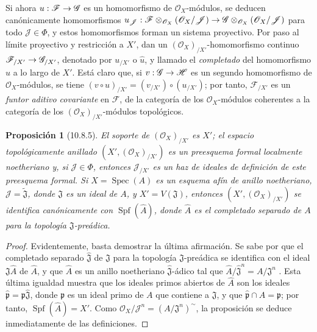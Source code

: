 \documentclass[oneside]{amsart}
\theoremstyle{ega-env-style}
\theoremstyle{ega-thm-env-style}
\newtheorem*{proposition}{Proposición}
\theoremstyle{ega-defn-env-style}
\renewcommand{\to}{\mathchoice{\longrightarrow}{\rightarrow}{\rightarrow}{\rightarrow}}
\let\EGAOriginalLabel\label
\renewcommand{\label}[1]{\phantomsection\EGAOriginalLabel{#1}}
\begin{document}
Si ahora $u:\mathscr{F}\to\mathscr{G}$ es un homomorfismo de $\mathscr{O}_X$-módulos, se deducen canónicamente homomorfismos $u_{\mathscr{J}}:
\mathscr{F}\otimes_{\mathscr{O}_X}(\mathscr{O}_X/\mathscr{J})
\to
\mathscr{G}\otimes_{\mathscr{O}_X}(\mathscr{O}_X/\mathscr{J})$ para todo $\mathscr{J}\in\Phi$, y estos homomorfismos forman un sistema proyectivo.
Por paso al límite proyectivo y restricción a $X'$, dan un $(\mathscr{O}_X)_{/X'}$-homomorfismo continuo $\mathscr{F}_{/X'}\to\mathscr{G}_{/X'}$, denotado por $u_{/X'}$ o $\widehat u$, y llamado el \emph{completado} del homomorfismo $u$ a lo largo de $X'$.
Está claro que, si $v:\mathscr{G}\to\mathscr{H}$ es un segundo homomorfismo de $\mathscr{O}_X$-módulos, se tiene $(v\circ u)_{/X'}=(v_{/X'})\circ(u_{/X'})$; por tanto, $\mathscr{F}_{/X'}$ es un \emph{funtor aditivo covariante} en $\mathscr{F}$, de la categoría de los $\mathscr{O}_X$-módulos coherentes a la categoría de los $(\mathscr{O}_X)_{/X'}$-módulos topológicos.

\begin{proposition}[10.8.5]
\label{I.10.8.5}
El soporte de $(\mathscr{O}_X)_{/X'}$ es $X'$; el espacio topológicamente anillado $(X',(\mathscr{O}_X)_{/X'})$ es un preesquema formal localmente noetheriano y, si $\mathscr{J}\in\Phi$, entonces $\mathscr{J}_{/X'}$ es un haz de ideales de definición de este preesquema formal.
Si $X=\operatorname{Spec}(A)$ es un esquema afín de anillo noetheriano, $\mathscr{J}=\widetilde{\mathfrak{J}}$, donde $\mathfrak{J}$ es un ideal de $A$, y $X'=V(\mathfrak{J})$, entonces $(X',(\mathscr{O}_X)_{/X'})$ se identifica canónicamente con $\operatorname{Spf}(\widehat A)$, donde $\widehat A$ es el completado separado de $A$ para la topología $\mathfrak{J}$-preádica.
\end{proposition}

\begin{proof}
Evidentemente, basta demostrar la última afirmación.
Se sabe por  que el completado separado $\widehat{\mathfrak{J}}$ de $\mathfrak{J}$ para la topología $\mathfrak{J}$-preádica se identifica con el ideal $\mathfrak{J}\widehat A$ de $\widehat A$, y que $\widehat A$ es un anillo noetheriano $\widehat{\mathfrak{J}}$-ádico tal que $\widehat A/\widehat{\mathfrak{J}}^n=A/\mathfrak{J}^n$ .
Esta última igualdad muestra que los ideales primos abiertos de $\widehat A$ son los ideales $\widehat{\mathfrak p}=\mathfrak p\widehat{\mathfrak{J}}$, donde $\mathfrak p$ es un ideal primo de $A$ que contiene a $\mathfrak{J}$, y que $\widehat{\mathfrak p}\cap A=\mathfrak p$; por tanto, $\operatorname{Spf}(\widehat A)=X'$.
Como $\mathscr{O}_X/\mathscr{J}^n=(A/\mathfrak{J}^n)^{\sim}$, la proposición se deduce inmediatamente de las definiciones.
\end{proof}
\end{document}
